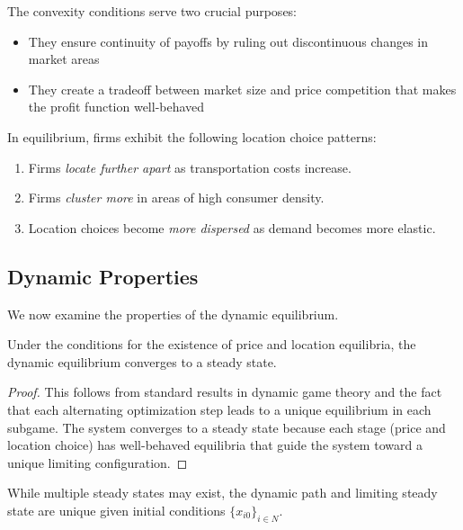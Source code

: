 \begin{remark}
The convexity conditions serve two crucial purposes:
\begin{itemize}
    \item They ensure continuity of payoffs by ruling out discontinuous changes in market areas
    \item They create a tradeoff between market size and price competition that makes the profit function well-behaved
\end{itemize}
\end{remark}

\begin{proposition}  
In equilibrium, firms exhibit the following location choice patterns:
\begin{enumerate}
    \item Firms \textit{locate further apart} as transportation costs increase.
    \item Firms \textit{cluster more} in areas of high consumer density.
    \item Location choices become \textit{more dispersed} as demand becomes more elastic.
\end{enumerate}
\end{proposition}

\subsection{Dynamic Properties}

We now examine the properties of the dynamic equilibrium.

\begin{proposition}[Convergence]  
Under the conditions for the existence of price and location equilibria, the dynamic equilibrium converges to a steady state.  
\end{proposition}

\begin{proof}
This follows from standard results in dynamic game theory and the fact that each alternating optimization step leads to a unique equilibrium in each subgame. The system converges to a steady state because each stage (price and location choice) has well-behaved equilibria that guide the system toward a unique limiting configuration.
\end{proof}

\begin{proposition}  
While multiple steady states may exist, the dynamic path and limiting steady state are unique given initial conditions \( \{x_{i0}\}_{i \in N} \).
\end{proposition}


